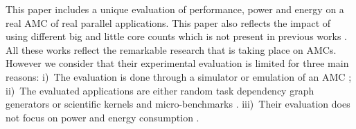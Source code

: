 This paper includes a unique evaluation of performance, power and energy on a real AMC of real parallel applications.
This paper also reflects the impact of using different big and little core counts which is not present in previous works \cite{Cong_quickIA}.
All these works reflect the remarkable research that is taking place on AMCs. 
However we consider that their experimental evaluation is limited for three main reasons:
i)~The evaluation is done through a simulator or emulation of an AMC 
\cite{Kumar_micro_2003, Morad_area_based, Balakrishnan:ISCA2005, 
	Koufaty_bias, VanCraeynest_fairness, VanCraeynest_PIE, Rodrigues_thread_scheduling, Hetero93, 
	Hetero95, Dup09, Suleman:APLOS2009, Joao:ASPLOS2012,Joao:ISCA2013};
ii)~The evaluated applications are either random task dependency graph generators or scientific 
kernels and micro-benchmarks \cite{Hetero93,HEFT,LDCP}.
iii)~Their evaluation does not focus on power and energy consumption 
\cite{Kumar:ISCA2004, 
	VanCraeynest_fairness, VanCraeynest_PIE, Hetero95, Chronaki:ICS2015}.
\fi
